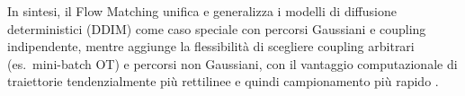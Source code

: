 In sintesi, il Flow Matching unifica e generalizza i modelli di diffusione
deterministici (DDIM) come caso speciale con percorsi Gaussiani e coupling
indipendente, mentre aggiunge la flessibilità di scegliere coupling
arbitrari (es.\ mini-batch OT) e percorsi non Gaussiani, con il vantaggio
computazionale di traiettorie tendenzialmente più rettilinee e quindi
campionamento più rapido \citep{lipman2022flow,liu2022flow,albergo2022building,bishop2024}.
